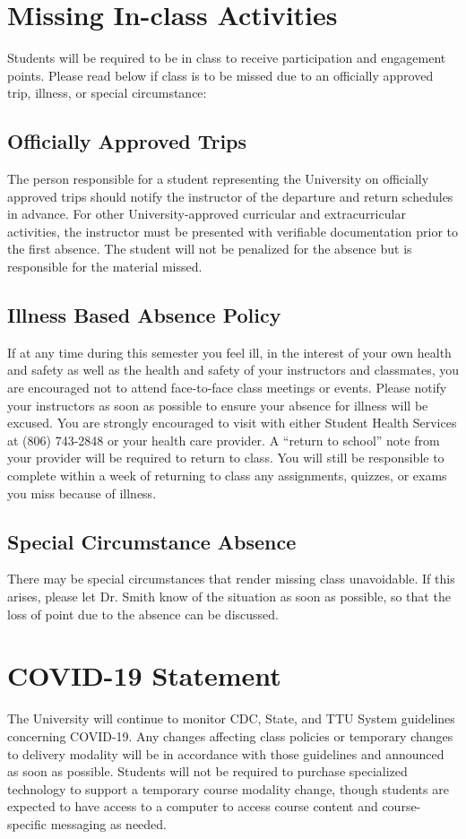 \documentclass[12pt, notitlepage]{article}   	%
\begin{document}
{\section{Missing In-class Activities}
Students will be required to be in class to receive participation and engagement points. 
Please read below if class is to be missed due to an officially approved trip, illness, or special circumstance:

\subsection{Officially Approved Trips}
The person responsible for a student representing the University on officially 
approved trips should notify the instructor of the departure and return schedules in advance. 
For other University-approved curricular and extracurricular activities, 
the instructor must be presented with verifiable documentation prior to the first absence. 
The student will not be penalized for the absence but is responsible for the material missed.

\subsection{Illness Based Absence Policy}
If at any time during this semester you feel ill, in the interest of your own 
health and safety as well as the health and safety of your instructors and classmates, 
you are encouraged not to attend face-to-face class meetings or events. 
Please notify your instructors as soon as possible to ensure your absence for 
illness will be excused. 
You are strongly encouraged to visit with either Student Health Services at (806) 743-2848 
or your health care provider. 
A “return to school” note from your provider will be required to return to class. 
You will still be responsible to complete within a week of returning to class any 
assignments, quizzes, or exams you miss because of illness.

\subsection{Special Circumstance Absence}
There may be special circumstances that render missing class unavoidable.
If this arises, please let Dr. Smith know of the situation as soon as possible,
so that the loss of point due to the absence can be discussed.

\section{COVID-19 Statement}
The University will continue to monitor CDC, State, and TTU System guidelines concerning COVID-19. 
Any changes affecting class policies or temporary changes to delivery modality will be in 
accordance with those guidelines and announced as soon as possible. Students will not be 
required to purchase specialized technology to support a temporary course modality change, 
though students are expected to have access to a computer to access course content and 
course-specific messaging as needed. 

}
\end{document}
